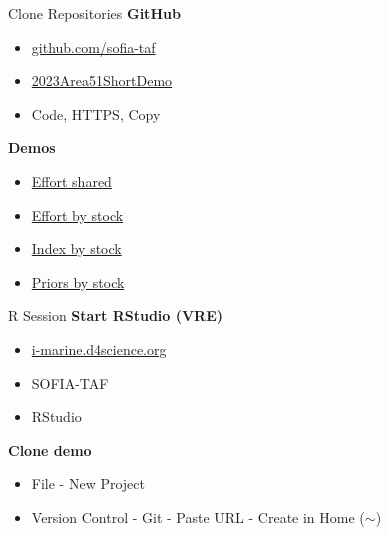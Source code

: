 \documentclass[aspectratio=169]{beamer}
\begin{document}

\begin{frame}{Clone Repositories}
  \textbf{\darkgreen GitHub}\\[0.5ex]
  \begin{itemize}\blue
    \item[] \href{https://github.com/sofia-taf}{github.com/sofia-taf}\\[1ex]
    \item[] \href{https://github.com/sofia-taf/2023Area51ShortDemo}%
    {2023Area51ShortDemo}
    \item[] \black Code, HTTPS, Copy\\[1ex]
  \end{itemize}
  \vspace{3ex}
  \textbf{\darkgreen Demos}\\[0.5ex]
  \begin{itemize}\blue
    \item[] \href{https://github.com/sofia-taf/2022Area31DemoEffortShared}%
    {Effort shared}\\[1ex]
    \item[] \href{https://github.com/sofia-taf/2022Area31DemoEffortByStock}%
    {Effort by stock}\\[1ex]
    \item[] \href{https://github.com/sofia-taf/2022Area31DemoIndexByStock}%
    {Index by stock}\\[1ex]
    \item[] \href{https://github.com/sofia-taf/2022Area41DemoPriorsByStock}%
    {Priors by stock}
  \end{itemize}
\end{frame}


\begin{frame}{R Session}
  \textbf{\darkgreen Start RStudio (VRE)}\\[0.3ex]
  \begin{itemize}
    \item[] {\blue\href{https://i-marine.d4science.org/}%
      {i-marine.d4science.org}}\\[1ex]
    \item[] SOFIA-TAF\\[1ex]
    \item[] RStudio\\[1ex]
  \end{itemize}
  \vspace{4ex}
  \textbf{\darkgreen Clone demo}\\[0.3ex]
  \begin{itemize}
    \item[] File - New Project\\[1ex]
    \item[] Version Control - Git - Paste URL - Create in Home ($\sim$)\\[1ex]
  \end{itemize}
\end{frame}
\end{document}
